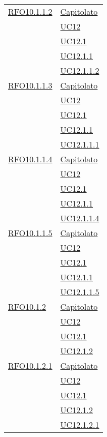 \begin{longtable}{|>{\centering}m{5cm}|m{5cm}<{\centering}|}
 \hyperlink{RFO10.1.1.2}{RFO10.1.1.2} & \hyperlink{Capitolato}{Capitolato}\\
& \hyperref[UC12]{UC12}\\
& \hyperref[UC12.1]{UC12.1}\\
& \hyperref[UC12.1.1]{UC12.1.1}\\
& \hyperref[UC12.1.1.2]{UC12.1.1.2}\\\hline

 \hyperlink{RFO10.1.1.3}{RFO10.1.1.3} & \hyperlink{Capitolato}{Capitolato}\\
& \hyperref[UC12]{UC12}\\
& \hyperref[UC12.1]{UC12.1}\\
& \hyperref[UC12.1.1]{UC12.1.1}\\
& \hyperref[UC12.1.1.1]{UC12.1.1.1}\\\hline

 \hyperlink{RFO10.1.1.4}{RFO10.1.1.4} & \hyperlink{Capitolato}{Capitolato}\\
& \hyperref[UC12]{UC12}\\
& \hyperref[UC12.1]{UC12.1}\\
& \hyperref[UC12.1.1]{UC12.1.1}\\
& \hyperref[UC12.1.1.4]{UC12.1.1.4}\\\hline

 \hyperlink{RFO10.1.1.5}{RFO10.1.1.5} & \hyperlink{Capitolato}{Capitolato}\\
& \hyperref[UC12]{UC12}\\
& \hyperref[UC12.1]{UC12.1}\\
& \hyperref[UC12.1.1]{UC12.1.1}\\
& \hyperref[UC12.1.1.5]{UC12.1.1.5}\\\hline

 \hyperlink{RFO10.1.2}{RFO10.1.2} & \hyperlink{Capitolato}{Capitolato}\\
& \hyperref[UC12]{UC12}\\
& \hyperref[UC12.1]{UC12.1}\\
& \hyperref[UC12.1.2]{UC12.1.2}\\\hline

 \hyperlink{RFO10.1.2.1}{RFO10.1.2.1} & \hyperlink{Capitolato}{Capitolato}\\
& \hyperref[UC12]{UC12}\\
& \hyperref[UC12.1]{UC12.1}\\
& \hyperref[UC12.1.2]{UC12.1.2}\\
& \hyperref[UC12.1.2.1]{UC12.1.2.1}\\\hline


\end{longtable}
